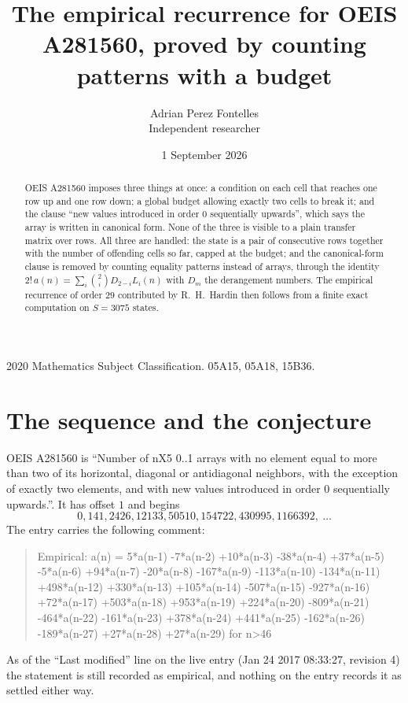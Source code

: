 \documentclass[11pt,a4paper]{article}
\title{The empirical recurrence for OEIS A281560, proved by counting patterns with a budget}
\author{Adrian Perez Fontelles\\ \small Independent researcher}
\date{1 September 2026}
\theoremstyle{plain}
\theoremstyle{definition}
\begin{document}
\maketitle

\begin{abstract}
OEIS A281560 imposes three things at once: a condition on each cell that reaches one row up and
one row down; a global budget allowing exactly two cells to
break it; and the clause ``new values introduced in order $0$ sequentially upwards'', which
says the array is written in canonical form. None of the three is visible to a plain transfer
matrix over rows. All three are handled: the state is a pair of consecutive rows
together with the number of offending cells so far, capped at the budget; and the
canonical-form clause is removed by counting equality patterns instead of arrays, through the
identity $2!\,a(n)=\sum_i\binom{2}{i}D_{2-i}L_i(n)$ with $D_m$ the derangement
numbers. The empirical recurrence of order $29$ contributed by R.~H.~Hardin then follows
from a finite exact computation on $S=3075$ states.
\end{abstract}

\noindent\small 2020 Mathematics Subject Classification. 05A15, 05A18, 15B36.\normalsize

\section{The sequence and the conjecture}

OEIS A281560 is ``Number of nX5 0..1 arrays with no element equal to more than two of its horizontal, diagonal or antidiagonal neighbors, with the exception of exactly two elements, and with new values introduced in order 0 sequentially upwards.''. It has offset $1$ and begins
\[
0, 141, 2426, 12133, 50510, 154722, 430995, 1166392,\ \dots
\]
The entry carries the following comment:
\begin{quote}\small
Empirical: a(n) = 5*a(n-1) -7*a(n-2) +10*a(n-3) -38*a(n-4) +37*a(n-5) -5*a(n-6) +94*a(n-7) -20*a(n-8) -167*a(n-9) -113*a(n-10) -134*a(n-11) +498*a(n-12) +330*a(n-13) +105*a(n-14) -507*a(n-15) -927*a(n-16) +72*a(n-17) +503*a(n-18) +953*a(n-19) +224*a(n-20) -809*a(n-21) -464*a(n-22) -161*a(n-23) +378*a(n-24) +441*a(n-25) -162*a(n-26) -189*a(n-27) +27*a(n-28) +27*a(n-29) for n>46
\end{quote}
As of the ``Last modified'' line on the live entry (Jan 24 2017 08:33:27, revision 4) the statement is
still recorded as empirical, and nothing on the entry records it as settled either way.
\end{document}
